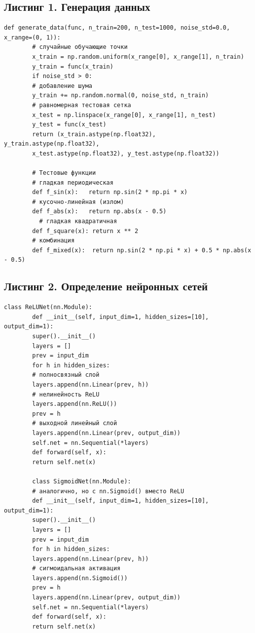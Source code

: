 \documentclass[12pt]{article}
\begin{document}
	\subsection*{Листинг 1. Генерация данных}
	\begin{lstlisting}[caption={Генерация обучающей и тестовой выборок}, label=lst:data]
		def generate_data(func, n_train=200, n_test=1000, noise_std=0.0, x_range=(0, 1)):
		# случайные обучающие точки
		x_train = np.random.uniform(x_range[0], x_range[1], n_train)
		y_train = func(x_train)
		if noise_std > 0:
		# добавление шума
		y_train += np.random.normal(0, noise_std, n_train) 
		# равномерная тестовая сетка
		x_test = np.linspace(x_range[0], x_range[1], n_test)
		y_test = func(x_test)
		return (x_train.astype(np.float32), y_train.astype(np.float32),
		x_test.astype(np.float32), y_test.astype(np.float32))
		
		# Тестовые функции
		# гладкая периодическая
		def f_sin(x):   return np.sin(2 * np.pi * x) 
		# кусочно-линейная (излом)
		def f_abs(x):   return np.abs(x - 0.5) 
		  # гладкая квадратичная  
		def f_square(x): return x ** 2            
		# комбинация      
		def f_mixed(x):  return np.sin(2 * np.pi * x) + 0.5 * np.abs(x - 0.5)  
	\end{lstlisting}
	
	\subsection*{Листинг 2. Определение нейронных сетей}
	\begin{lstlisting}[caption={Классы ReLU-сети и сигмоидальной сети}, label=lst:models]
		class ReLUNet(nn.Module):
		def __init__(self, input_dim=1, hidden_sizes=[10], output_dim=1):
		super().__init__()
		layers = []
		prev = input_dim
		for h in hidden_sizes:  
		# полносвязный слой       
		layers.append(nn.Linear(prev, h))    
		# нелинейность ReLU
		layers.append(nn.ReLU())             
		prev = h
		# выходной линейный слой
		layers.append(nn.Linear(prev, output_dim)) 
		self.net = nn.Sequential(*layers)
		def forward(self, x):
		return self.net(x)
		
		class SigmoidNet(nn.Module):
		# аналогично, но с nn.Sigmoid() вместо ReLU
		def __init__(self, input_dim=1, hidden_sizes=[10], output_dim=1):
		super().__init__()
		layers = []
		prev = input_dim
		for h in hidden_sizes:
		layers.append(nn.Linear(prev, h))
		# сигмоидальная активация
		layers.append(nn.Sigmoid())     
		prev = h
		layers.append(nn.Linear(prev, output_dim))
		self.net = nn.Sequential(*layers)
		def forward(self, x):
		return self.net(x)
	\end{lstlisting}
	
\end{document}

